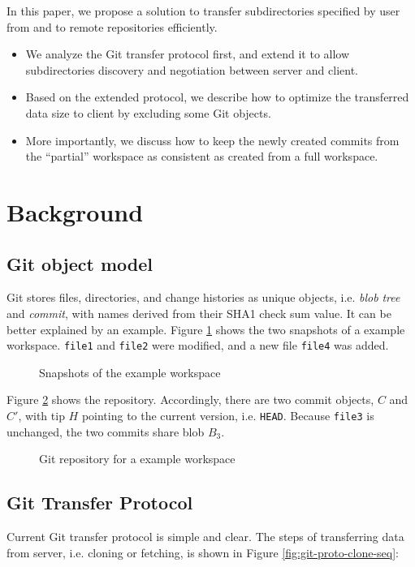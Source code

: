 \documentclass[preprint]{sigplanconf}
\begin{document}
In this paper, we propose a solution to transfer subdirectories specified by
user from and to remote repositories efficiently.

\begin{itemize}
  \item We analyze the Git transfer protocol first, and extend it to allow
      subdirectories discovery and negotiation between server and client.
  \item Based on the extended protocol, we describe how to optimize the
      transferred data size to client by excluding some Git objects.
  \item More importantly, we discuss how to keep the newly created commits from
      the ``partial'' workspace as consistent as created from a full workspace.
\end{itemize}

\section{Background}
\subsection{Git object model}
Git stores files, directories, and change histories as unique objects, i.e.
\emph{blob} \emph{tree} and \emph{commit}, with names derived from their SHA1
check sum value\cite{gitobj}.
It can be better explained by an example.
Figure \ref{fig:workspace} shows the two snapshots of a example workspace.
\verb|file1| and \verb|file2| were modified, and a new file \verb|file4| was
added.
\begin{figure}[htpb]
  \centering
  
  \caption{Snapshots of the example workspace}
  \label{fig:workspace}
\end{figure}

Figure \ref{fig:git-repo} shows the repository.
Accordingly, there are two commit objects, $C$ and $C'$, with tip $H$ pointing
to the current version, i.e. \verb|HEAD|.
Because \verb|file3| is unchanged, the two commits share blob $B_3$.

\begin{figure}[htpb]
  \centering
  
  \caption{Git repository for a example workspace}
  \label{fig:git-repo}
\end{figure}

\subsection{Git Transfer Protocol}
Current Git transfer protocol is simple and clear\cite{tran-protocol}.
The steps of transferring data from server, i.e. cloning or fetching, is shown
in Figure \ref{fig:git-proto-clone-seq}:
\end{document}
